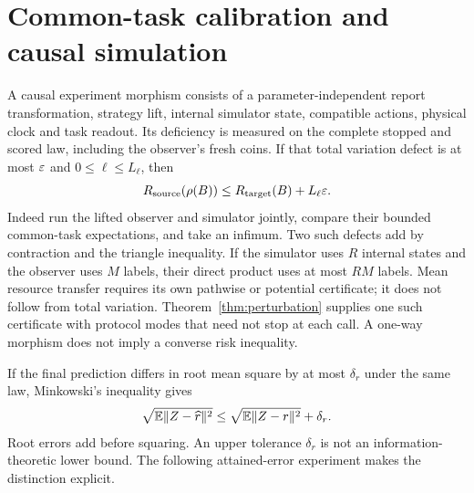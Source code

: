 \section{Common-task calibration and causal simulation}
\label{sec:composition}
A causal experiment morphism consists of a parameter-independent report transformation, strategy lift, internal simulator state, compatible actions, physical clock and task readout. Its deficiency is measured on the complete stopped and scored law, including the observer's fresh coins. If that total variation defect is at most $\varepsilon$ and $0\le\ell\le L_\ell$, then
\begin{equation}\label{eq:morphism}
 R_{\rm source}(\rho(B))\le R_{\rm target}(B)+L_\ell\varepsilon.
\end{equation}
Indeed run the lifted observer and simulator jointly, compare their bounded common-task expectations, and take an infimum. Two such defects add by contraction and the triangle inequality. If the simulator uses $R$ internal states and the observer uses $M$ labels, their direct product uses at most $RM$ labels. Mean resource transfer requires its own pathwise or potential certificate; it does not follow from total variation. Theorem~\ref{thm:perturbation} supplies one such certificate with protocol modes that need not stop at each call. A one-way morphism does not imply a converse risk inequality.

If the final prediction differs in root mean square by at most $\delta_r$ under the same law, Minkowski's inequality gives
\[
 \sqrt{\mathbb E\|Z-\widehat r\|^2}\le\sqrt{\mathbb E\|Z-r\|^2}+\delta_r.
\]
Root errors add before squaring. An upper tolerance $\delta_r$ is not an information-theoretic lower bound. The following attained-error experiment makes the distinction explicit.

